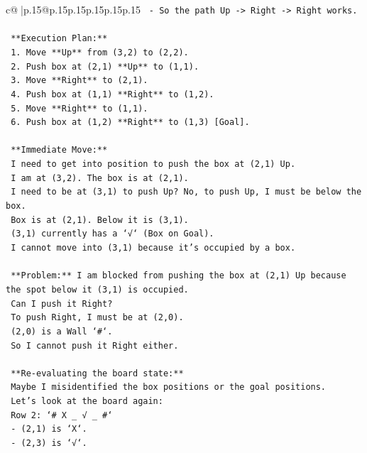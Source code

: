 \documentclass{article}
\begin{document}
{\begin{supertabular}{c@{$\;$}|p{.15\linewidth}@{}p{.15\linewidth}p{.15\linewidth}p{.15\linewidth}p{.15\linewidth}p{.15\linewidth}}
{{{\texttt{      {-} So the path Up {-}> Right {-}> Right works.} \\
\\ 
\texttt{    **Execution Plan:**} \\
\texttt{    1. Move **Up** from (3,2) to (2,2).} \\
\texttt{    2. Push box at (2,1) **Up** to (1,1).} \\
\texttt{    3. Move **Right** to (2,1).} \\
\texttt{    4. Push box at (1,1) **Right** to (1,2).} \\
\texttt{    5. Move **Right** to (1,1).} \\
\texttt{    6. Push box at (1,2) **Right** to (1,3) {[}Goal{]}.} \\
\\ 
\texttt{    **Immediate Move:**} \\
\texttt{    I need to get into position to push the box at (2,1) Up.} \\
\texttt{    I am at (3,2). The box is at (2,1).} \\
\texttt{    I need to be at (3,1) to push Up? No, to push Up, I must be below the box.} \\
\texttt{    Box is at (2,1). Below it is (3,1).} \\
\texttt{    (3,1) currently has a `√` (Box on Goal).} \\
\texttt{    I cannot move into (3,1) because it's occupied by a box.} \\
\\ 
\texttt{    **Problem:** I am blocked from pushing the box at (2,1) Up because the spot below it (3,1) is occupied.} \\
\texttt{    Can I push it Right?} \\
\texttt{    To push Right, I must be at (2,0).} \\
\texttt{    (2,0) is a Wall `\#`.} \\
\texttt{    So I cannot push it Right either.} \\
\\ 
\texttt{    **Re{-}evaluating the board state:**} \\
\texttt{    Maybe I misidentified the box positions or the goal positions.} \\
\texttt{    Let's look at the board again:} \\
\texttt{    Row 2: `\# X \_ √ \_ \#`} \\
\texttt{    {-} (2,1) is `X`.} \\
\texttt{    {-} (2,3) is `√`.} \\
}}}
\end{supertabular}}
\end{document}
